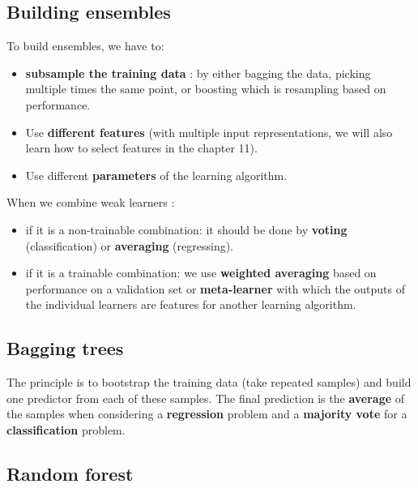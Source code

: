 \documentclass[a4paper,12pt]{article}
\begin{document}
\subsection{Building ensembles}

To build ensembles, we have to:

\begin{itemize}
\item \textbf{subsample the training data} : by either bagging the data, picking multiple times the same point, or boosting which is resampling based on performance.

\item Use \textbf{different features} (with multiple input representations, we will also learn how to select features in the chapter 11).


\item Use different \textbf{parameters} of the learning algorithm.\\

\end{itemize}

When we combine weak learners : 

\begin{itemize}
\item if it is a non-trainable combination: it should be done by \textbf{voting} (classification) or \textbf{averaging} (regressing).


\item if it is a trainable combination: we use \textbf{weighted averaging} based on performance on a validation set or \textbf{meta-learner} with which the outputs of the individual learners are features for another learning algorithm. 

\end{itemize}

\subsection{Bagging trees}

The principle is to bootstrap the training data (take repeated samples) and build one predictor from each of these samples. The final prediction is the \textbf{average} of the samples when considering a \textbf{regression} problem and a \textbf{majority vote} for a \textbf{classification} problem.


\subsection{Random forest}
\end{document}
